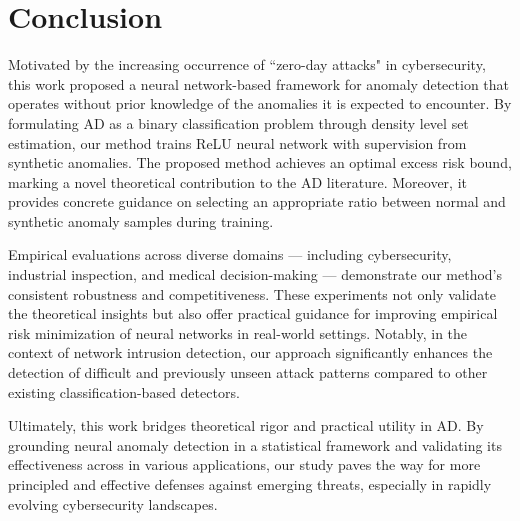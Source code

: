 \documentclass{article}
\begin{document}

\section{Conclusion 
}\label{section:conclusion}
Motivated by the increasing occurrence of  ``zero-day attacks" in cybersecurity, this work proposed a neural network-based framework for anomaly detection that operates without prior knowledge of the anomalies it is expected to encounter.
By formulating AD as a binary classification problem through density level set estimation, our method trains ReLU neural network with supervision from synthetic anomalies.
The proposed method achieves an optimal excess risk bound, marking a novel theoretical contribution to the AD literature. 
Moreover, it provides concrete guidance on selecting an appropriate ratio between normal and synthetic anomaly samples during training.

Empirical evaluations across diverse domains --- including cybersecurity, industrial inspection, and medical decision-making --- demonstrate our method’s consistent robustness and competitiveness.
These experiments not only validate the theoretical insights but also offer practical guidance for improving empirical risk minimization of neural networks in real-world settings.
Notably, in the context of network intrusion detection, our approach significantly enhances the detection of difficult and previously unseen attack patterns compared to other existing classification-based detectors.

Ultimately, this work bridges theoretical rigor and practical utility in AD. By grounding neural anomaly detection in a statistical framework and validating its effectiveness across in various applications, our study paves the way for more principled and effective defenses against emerging threats, especially in rapidly evolving cybersecurity landscapes.
\end{document}
